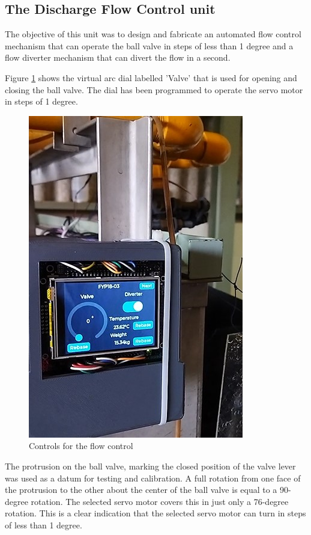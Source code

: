 \subsection{The Discharge Flow Control unit}
The objective of this unit was to design and fabricate an automated flow control mechanism that can operate the ball valve in steps of less than 1 degree and a flow diverter mechanism that can divert the flow in a second. 
\par
Figure \ref{fig:Setting the number of steps from the user interface} shows the virtual arc dial labelled 'Valve' that is used for opening and closing the ball valve. The dial has been programmed to operate the servo motor in steps of 1 degree.
\begin{figure}[H]
\centering
\includegraphics{Figures/flow_cotrol_control.jpg}
\caption{Controls for the flow control}
\label{fig:Setting the number of steps from the user interface}
\end{figure}
The protrusion on the ball valve, marking the closed position of the valve lever was used as a datum for testing and calibration. A full rotation from one face of the protrusion to the other about the center of the ball valve is equal to a 90-degree rotation. The selected servo motor covers this in just only a 76-degree rotation. This is a clear indication that the selected servo motor can turn in steps of less than 1 degree.
